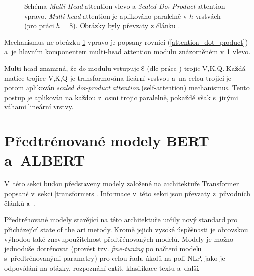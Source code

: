\begin{figure}[hbt]
    \centering
	\caption{Schéma \emph{Multi-Head} attention vlevo a \emph{Scaled Dot-Product} attention vpravo. \emph{Multi-head} attention je aplikováno paralelně v $h$ vrstvách (pro práci \cite{Transformers} $h=8$). Obrázky byly převzaty z článku \cite{Transformers}.}
	\label{multihead}
\end{figure}

Mechanismus ne obrázku \ref{multihead} vpravo je popsaný rovnicí (\ref{attention_dot_product}) a~je hlavním komponentem multi-head attention modulu znázorněném v~\ref{multihead} vlevo.\par
Multi-head znamená, že do modulu vstupuje 8 (dle práce \cite{Transformers}) trojic V,K,Q. Každá matice trojice V,K,Q je transformována lieární vrstvou a~na celou trojici je potom aplikován \emph{scaled dot-product attention} (self-attention) mechanismus. Tento postup je aplikován na každou z~osmi trojic paralelně, pokaždé však s~jinými váhami lineární vrstvy.

\section{Předtrénované modely BERT a~ALBERT}
\label{bert_albert}

V~této sekci budou představeny modely založené na architektuře Transformer popsané v~sekci \ref{transformers}. Informace v~této sekci jsou převzaty z~původních článků \cite{BERT} a~\cite{ALBERT}.\par
Předtrénované modely stavějící na této architektuře určily nový standard pro přicházející state of the art metody. Kromě jejich vysoké úspěšnosti je obrovskou výhodou také znovupoužitelnost předtřénovaných modelů. Modely je možno jednoduše dotrénovat (provést tzv. \emph{fine-tuning} po načtení modelu s~předtrénovanými parametry) pro celou řadu úkolů na poli NLP, jako je odpovídání na otázky, rozpoznání entit, klasifikace textu a~další.

